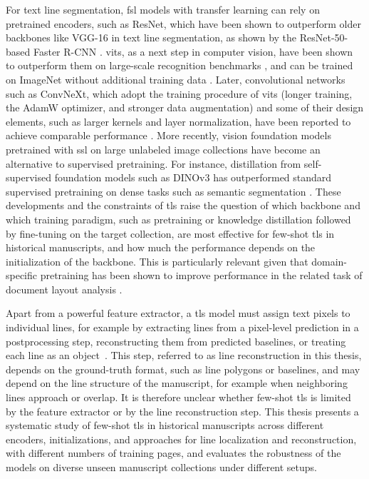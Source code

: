 For text line segmentation, \gls{fsl} models with transfer learning can rely on pretrained encoders, such as ResNet, which have been shown to outperform older backbones like VGG-16 in text line segmentation, as shown by the ResNet-50-based Faster R-CNN \cite{jindal2023fasterrcnn}.
\Glspl{vit}, as a next step in computer vision, have been shown to outperform them on large-scale recognition benchmarks \cite{dosovitskiy2021imageworth16x16words}, and can be trained on ImageNet without additional training data \cite{touvron2021trainingdataefficientimagetransformers}. Later, convolutional networks such as ConvNeXt, which adopt the training procedure of \glspl{vit} (longer training, the AdamW optimizer, and stronger data augmentation) and some of their design elements, such as larger kernels and layer normalization, have been reported to achieve comparable performance \cite{liu2022convnet2020s}. More recently, vision foundation models pretrained with \gls{ssl} on large unlabeled image collections have become an alternative to supervised pretraining. For instance, distillation from self-supervised foundation models such as DINOv3 has outperformed standard supervised pretraining on dense tasks such as semantic segmentation \cite{dinov3}. These developments and the constraints of \gls{tls} raise the question of which backbone and which training paradigm, such as pretraining or knowledge distillation followed by fine-tuning on the target collection, are most effective for few-shot \gls{tls} in historical manuscripts, and how much the performance depends on the initialization of the backbone. This is particularly relevant given that domain-specific pretraining has been shown to improve performance in the related task of document layout analysis \cite{denardin2025indomain}.

Apart from a powerful feature extractor, a \gls{tls} model must assign text pixels to individual lines, for example by extracting lines from a pixel-level prediction in a postprocessing step, reconstructing them from predicted baselines, or treating each line as an object~\cite{Rabaev_Litvak_2025}. This step, referred to as line reconstruction in this thesis, depends on the ground-truth format, such as line polygons or baselines, and may depend on the line structure of the manuscript, for example when neighboring lines approach or overlap. It is therefore unclear whether few-shot \gls{tls} is limited by the feature extractor or by the line reconstruction step. This thesis presents a systematic study of few-shot \gls{tls} in historical manuscripts across different encoders, initializations, and approaches for line localization and reconstruction, with different numbers of training pages, and evaluates the robustness of the models on diverse unseen manuscript collections under different setups.


